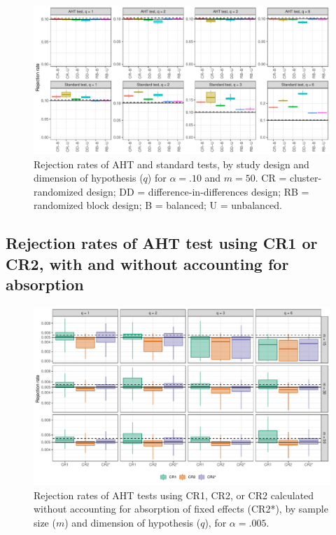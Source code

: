 \documentclass[12pt]{article}
\begin{document}
\begin{landscape}
\begin{figure}[H]
{\centering \includegraphics[width=\linewidth]{CR_fig/balance_10_50-1} 

}

\caption{Rejection rates of AHT and standard tests, by study design and dimension of hypothesis ($q$) for $\alpha = .10$ and $m = 50$. CR = cluster-randomized design; DD = difference-in-differences design; RB = randomized block design; B = balanced; U = unbalanced.}\label{fig:balance_10_50}
\end{figure}

\subsection{Rejection rates of AHT test using CR1 or CR2, with and without accounting for absorption}

\begin{figure}[H]

{\centering \includegraphics[width=\linewidth]{CR_fig/absorption_005-1} 

}

\caption{Rejection rates of AHT tests using CR1, CR2, or CR2 calculated without accounting for absorption of fixed effects (CR2*), by sample size ($m$) and dimension of hypothesis ($q$), for $\alpha = .005$.}\label{fig:absorption_005}
\end{figure}


\end{landscape}
\end{document}
